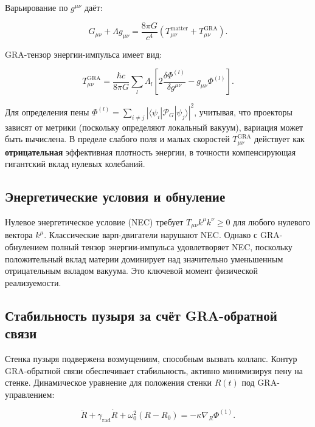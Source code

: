 \documentclass[11pt]{article}
\begin{document}
Варьирование по $g^{\mu\nu}$ даёт:

\begin{equation}
G_{\mu\nu} + \Lambda g_{\mu\nu} = \frac{8\pi G}{c^4} \left( T_{\mu\nu}^{\text{matter}} + T_{\mu\nu}^{\text{GRA}} \right).
\label{eq:modified_einstein}
\end{equation}

GRA-тензор энергии-импульса имеет вид:

\begin{equation}
T_{\mu\nu}^{\text{GRA}} = \frac{\hbar c}{8\pi G} \sum_l \Lambda_l \left[ 2 \frac{\delta \Phi^{(l)}}{\delta g^{\mu\nu}} - g_{\mu\nu} \Phi^{(l)} \right].
\label{eq:GRA_stress_energy}
\end{equation}

Для определения пены $\Phi^{(l)} = \sum_{i \neq j} |\langle \psi_i | \mathcal{P}_G | \psi_j \rangle|^2$, учитывая, что проекторы зависят от метрики (поскольку определяют локальный вакуум), вариация может быть вычислена. В пределе слабого поля и малых скоростей $T_{\mu\nu}^{\text{GRA}}$ действует как \textbf{отрицательная} эффективная плотность энергии, в точности компенсирующая гигантский вклад нулевых колебаний.

\subsection{Энергетические условия и обнуление}

Нулевое энергетическое условие (NEC) требует $T_{\mu\nu} k^\mu k^\nu \ge 0$ для любого нулевого вектора $k^\mu$. Классические варп-двигатели нарушают NEC. Однако с GRA-обнулением полный тензор энергии-импульса удовлетворяет NEC, поскольку положительный вклад материи доминирует над значительно уменьшенным отрицательным вкладом вакуума. Это ключевой момент физической реализуемости.

\subsection{Стабильность пузыря за счёт GRA-обратной связи}

Стенка пузыря подвержена возмущениям, способным вызвать коллапс. Контур GRA-обратной связи обеспечивает стабильность, активно минимизируя пену на стенке. Динамическое уравнение для положения стенки $R(t)$ под GRA-управлением:

\begin{equation}
\ddot{R} + \gamma_{\text{rad}} \dot{R} + \omega_0^2 (R - R_0) = - \kappa \nabla_R \Phi^{(1)}.
\label{eq:stability}
\end{equation}
\end{document}
